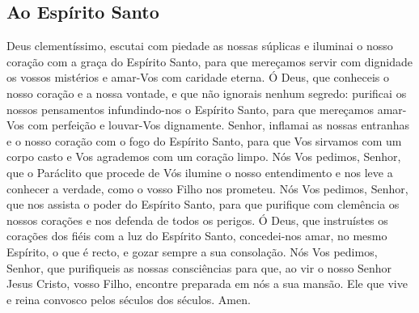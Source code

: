 \subsection{Ao Espírito Santo}
 Deus clementíssimo, escutai com piedade as nossas súplicas e iluminai o nosso coração com a graça do Espírito Santo, para que mereçamos servir com dignidade os vossos mistérios e amar-Vos com caridade eterna. Ó Deus, que conheceis o nosso coração e a nossa vontade, e que não ignorais nenhum segredo: purificai os nossos pensamentos infundindo-nos o Espírito Santo, para que mereçamos amar-Vos com perfeição e louvar-Vos dignamente. Senhor, inflamai as nossas entranhas e o nosso coração com o fogo do Espírito Santo, para que Vos sirvamos com um corpo casto e Vos agrademos com um coração limpo. Nós Vos pedimos, Senhor, que o Paráclito que procede de Vós ilumine o nosso entendimento e nos leve a conhecer a verdade, como o vosso Filho nos prometeu. Nós Vos pedimos, Senhor, que nos assista o poder do Espírito Santo, para que purifique com clemência os nossos corações e nos defenda de todos os perigos. Ó Deus, que instruístes os corações dos fiéis com a luz do Espírito Santo, concedei-nos amar, no mesmo Espírito, o que é recto, e gozar sempre a sua consolação. Nós Vos pedimos, Senhor, que purifiqueis as nossas consciências para que, ao vir o nosso Senhor Jesus Cristo, vosso Filho, encontre preparada em nós a sua mansão. Ele que vive e reina convosco pelos séculos dos séculos. Amen.

